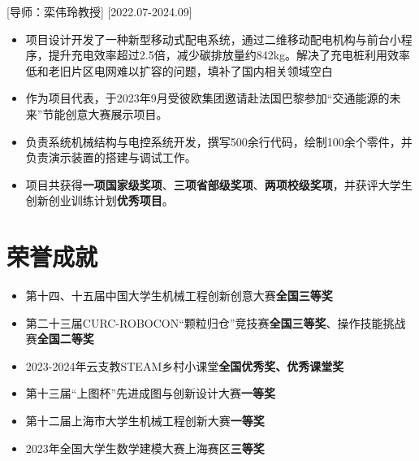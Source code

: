 \documentclass{resume}
\begin{document}
[导师：栾伟玲教授]
[2022.07-2024.09]
\begin{itemize}
  \item 项目设计开发了一种新型移动式配电系统，通过二维移动配电机构与前台小程序，提升充电效率超过2.5倍，减少碳排放量约842kg。解决了充电桩利用效率低和老旧片区电网难以扩容的问题，填补了国内相关领域空白
  \item 作为项目代表，于2023年9月受彼欧集团邀请赴法国巴黎参加“交通能源的未来”节能创意大赛展示项目。
  \item 负责系统机械结构与电控系统开发，撰写500余行代码，绘制100余个零件，并负责演示装置的搭建与调试工作。
  \item 项目共获得\textbf{一项国家级奖项}、\textbf{三项省部级奖项}、\textbf{两项校级奖项}，并获评大学生创新创业训练计划\textbf{优秀项目}。
\end{itemize}


\section{荣誉成就}

\begin{itemize}
  \item 第十四、十五届中国大学生机械工程创新创意大赛\textbf{全国三等奖}
  \item 第二十三届CURC-ROBOCON“颗粒归仓”竞技赛\textbf{全国三等奖}、操作技能挑战赛\textbf{全国二等奖}
  \item 2023-2024年云支教STEAM乡村小课堂\textbf{全国优秀奖、优秀课堂奖}
  \item 第十三届“上图杯”先进成图与创新设计大赛\textbf{一等奖}
  \item 第十二届上海市大学生机械工程创新大赛\textbf{一等奖}
  \item 2023年全国大学生数学建模大赛上海赛区\textbf{三等奖}
\end{itemize}
\end{document}
